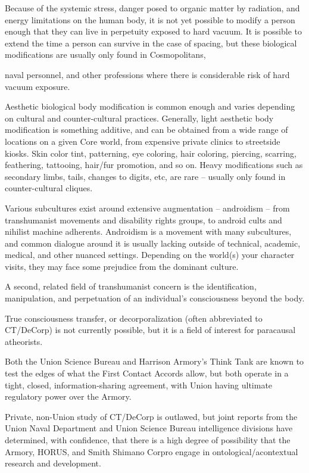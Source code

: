 Because of the systemic stress, danger posed to organic matter by radiation, and energy
limitations on the human body, it is not yet possible to modify a person enough that they can live
in perpetuity exposed to hard vacuum. It is possible to extend the time a person can survive in
the case of spacing, but these biological modifications are usually only found in Cosmopolitans,




naval personnel, and other professions where there is considerable risk of hard vacuum
exposure.


Aesthetic biological body modification is common enough and varies depending on cultural and
counter-cultural practices. Generally, light aesthetic body modification is something additive, and
can be obtained from a wide range of locations on a given Core world, from expensive private
clinics to streetside kiosks. Skin color tint, patterning, eye coloring, hair coloring, piercing,
scarring, feathering, tattooing, hair/fur promotion, and so on. Heavy modifications such as
secondary limbs, tails, changes to digits, etc, are rare -- usually only found in counter-cultural
cliques.


Various subcultures exist around extensive augmentation -- androidism -- from transhumanist
movements and disability rights groups, to android cults and nihilist machine adherents.
Androidism is a movement with many subcultures, and common dialogue around it is usually
lacking outside of technical, academic, medical, and other nuanced settings. Depending on the
world(s) your character visits, they may face some prejudice from the dominant culture.


A second, related field of transhumanist concern is the identification, manipulation, and
perpetuation of an individual’s consciousness beyond the body.


True consciousness transfer, or decorporalization (often abbreviated to CT/DeCorp) is not
currently possible, but it is a field of interest for paracausal atheorists.

Both the Union Science Bureau and Harrison Armory’s Think Tank are known to test the edges of
what the First Contact Accords allow, but both operate in a tight, closed, information-sharing
agreement, with Union having ultimate regulatory power over the Armory.


Private, non-Union study of CT/DeCorp is outlawed, but joint reports from the Union Naval
Department and Union Science Bureau intelligence divisions have determined, with confidence,
that there is a high degree of possibility that the Armory, HORUS, and Smith Shimano Corpro
engage in ontological/acontextual research and development.


